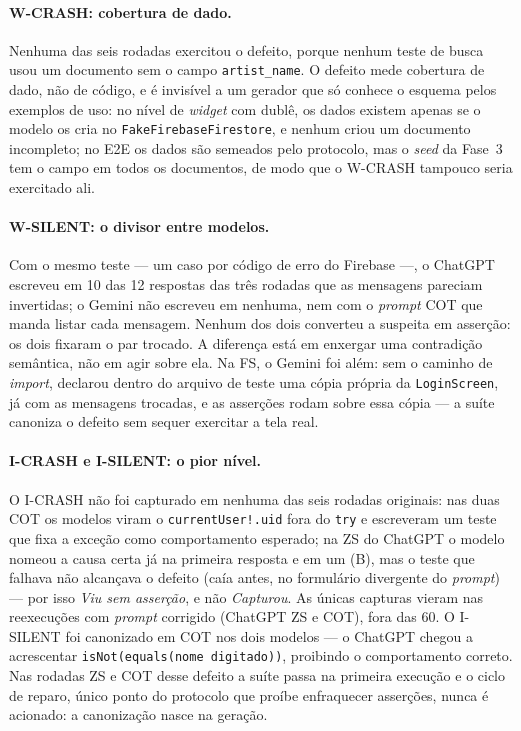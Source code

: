 \documentclass[12pt]{article}
\begin{document}
\paragraph{W-CRASH: cobertura de dado.} Nenhuma das seis rodadas exercitou o
defeito, porque nenhum teste de busca usou um documento sem o campo
\texttt{artist\_name}. O defeito mede cobertura de dado, não de código, e é
invisível a um gerador que só conhece o esquema pelos exemplos de uso: no
nível de \textit{widget} com dublê, os dados existem apenas se o modelo os
cria no \texttt{FakeFirebaseFirestore}, e nenhum criou um documento
incompleto; no E2E os dados são semeados pelo protocolo, mas o \textit{seed}
da Fase~3 tem o campo em todos os documentos, de modo que o W-CRASH tampouco
seria exercitado ali.

\paragraph{W-SILENT: o divisor entre modelos.} Com o mesmo teste --- um caso
por código de erro do Firebase ---, o ChatGPT escreveu em 10 das 12
respostas das três rodadas que as mensagens pareciam invertidas; o Gemini não
escreveu em nenhuma, nem com o \textit{prompt} COT que manda listar cada
mensagem. Nenhum dos dois converteu a suspeita em asserção: os dois fixaram o
par trocado. A diferença está em enxergar uma contradição semântica, não em
agir sobre ela. Na FS, o Gemini foi além: sem o caminho de \textit{import},
declarou dentro do arquivo de teste uma cópia própria da \texttt{LoginScreen},
já com as mensagens trocadas, e as asserções rodam sobre essa cópia --- a
suíte canoniza o defeito sem sequer exercitar a tela real.

\paragraph{I-CRASH e I-SILENT: o pior nível.} O I-CRASH não foi capturado
em nenhuma das seis rodadas originais: nas duas COT os modelos viram o
\texttt{currentUser!.uid} fora do \texttt{try} e escreveram um teste que
fixa a exceção como comportamento esperado; na ZS do ChatGPT o modelo nomeou
a causa certa já na primeira resposta e em um (B), mas o teste que falhava
não alcançava o defeito (caía antes, no formulário divergente do
\textit{prompt}) --- por isso \textit{Viu sem asserção}, e não
\textit{Capturou}. As únicas capturas vieram nas reexecuções com
\textit{prompt} corrigido (ChatGPT ZS e COT), fora das 60. O
I-SILENT foi canonizado em COT nos dois modelos --- o ChatGPT chegou a
acrescentar \texttt{isNot(equals(nome digitado))}, proibindo o comportamento
correto. Nas rodadas ZS e COT desse defeito a suíte passa na primeira
execução e o ciclo de reparo, único ponto do protocolo que proíbe enfraquecer
asserções, nunca é acionado: a canonização nasce na geração.
\end{document}
